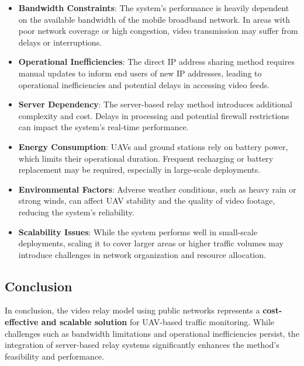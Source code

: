 \begin{itemize}
    \item \textbf{Bandwidth Constraints}: The system's performance is heavily dependent on the available bandwidth of the mobile broadband network. In areas with poor network coverage or high congestion, video transmission may suffer from delays or interruptions.
    
    \item \textbf{Operational Inefficiencies}: The direct IP address sharing method requires manual updates to inform end users of new IP addresses, leading to operational inefficiencies and potential delays in accessing video feeds.
    
    \item \textbf{Server Dependency}: The server-based relay method introduces additional complexity and cost. Delays in processing and potential firewall restrictions can impact the system's real-time performance.
    
    \item \textbf{Energy Consumption}: UAVs and ground stations rely on battery power, which limits their operational duration. Frequent recharging or battery replacement may be required, especially in large-scale deployments.
    
    \item \textbf{Environmental Factors}: Adverse weather conditions, such as heavy rain or strong winds, can affect UAV stability and the quality of video footage, reducing the system's reliability.
    
    \item \textbf{Scalability Issues}: While the system performs well in small-scale deployments, scaling it to cover larger areas or higher traffic volumes may introduce challenges in network organization and resource allocation.
\end{itemize}

\vspace{\baselineskip} %

\subsection{Conclusion}
In conclusion, the video relay model using public networks represents a \textbf{cost-effective and scalable solution} for UAV-based traffic monitoring. While challenges such as bandwidth limitations and operational inefficiencies persist, the integration of server-based relay systems significantly enhances the method's feasibility and performance.


